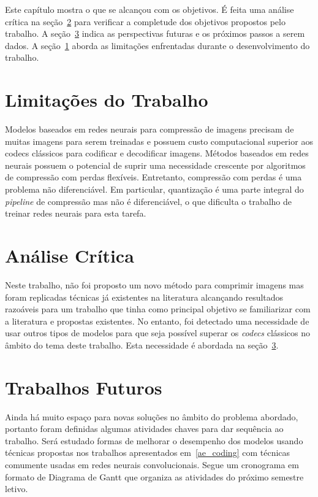 Este capítulo mostra o que se alcançou com os objetivos. É feita uma análise crítica na seção~\ref{sec:analise} para verificar a completude dos objetivos propostos pelo trabalho. A seção~\ref{sec:futuro} indica as perspectivas futuras e os próximos passos a serem dados. A seção~\ref{sec:limitacoes} aborda as limitações enfrentadas durante o desenvolvimento do trabalho.

\section{Limitações do Trabalho}
\label{sec:limitacoes}
Modelos baseados em redes neurais para compressão de imagens precisam de muitas imagens para serem treinadas e possuem custo computacional superior aos codecs clássicos para codificar e decodificar imagens. Métodos baseados em redes neurais possuem o potencial de suprir uma necessidade crescente por algoritmos de compressão com perdas flexíveis. Entretanto, compressão com perdas é uma problema não diferenciável. Em particular, quantização é uma parte integral do \textit{pipeline} de compressão mas não é diferenciável, o que dificulta o trabalho de treinar redes neurais para esta tarefa.
\section{Análise Crítica}
\label{sec:analise}
Neste trabalho, não foi proposto um novo método para comprimir imagens mas foram replicadas técnicas já existentes na literatura alcançando resultados razoáveis para um trabalho que tinha como principal objetivo se familiarizar com a literatura e propostas existentes. No entanto, foi detectado uma necessidade de usar outros tipos de modelos para que seja possível superar os \textit{codecs} clássicos no âmbito do tema deste trabalho. Esta necessidade é abordada na seção~\ref{sec:futuro}.
\section{Trabalhos Futuros}
\label{sec:futuro}
Ainda há muito espaço para novas soluções no âmbito do problema abordado, portanto foram definidas algumas atividades chaves para dar sequência ao trabalho. Será estudado formas de melhorar o desempenho dos modelos usando técnicas propostas nos trabalhos apresentados em~\ref{ae_coding} com técnicas comumente usadas em redes neurais convolucionais. Segue um cronograma em formato de Diagrama de Gantt que organiza as atividades do próximo semestre letivo.

